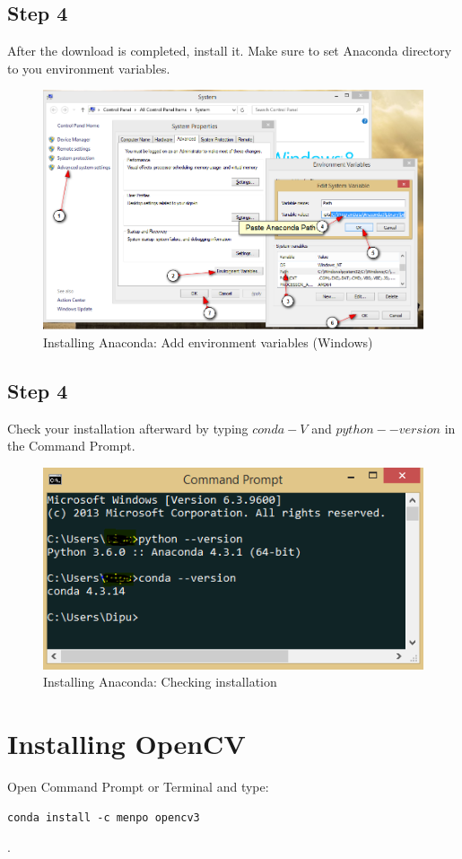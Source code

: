 \subsection{Step 4}
After the download is completed, install it. Make sure to set Anaconda directory to you environment variables.
\begin{figure}[!hbt]
\centering
\includegraphics[width=0.8\linewidth]{./img/env-vars}
\caption{Installing Anaconda: Add environment variables (Windows)}
\label{fig:Anaconda1}
\end{figure}

\subsection{Step 4}
Check your installation afterward by typing $conda -V$ and $python --version$ in the Command Prompt. 
\begin{figure}[!hbt]
\centering
\includegraphics[width=0.8\linewidth]{./img/conda-check}
\caption{Installing Anaconda: Checking installation}
\label{fig:Anaconda1}
\end{figure}


\section{Installing OpenCV} 
Open Command Prompt or Terminal and type: 
\begin{lstlisting}
conda install -c menpo opencv3
\end{lstlisting}. 

